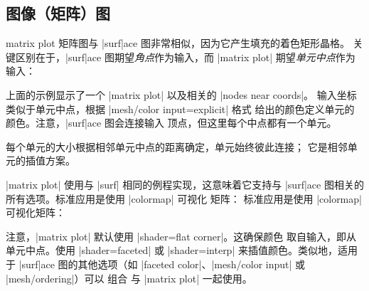 {\subsection{图像（矩阵）图}
\label{sec:imagesc}

\begin{plottype}[/pgfplots]{matrix plot}
    矩阵图与 |surf|ace 图非常相似，因为它产生填充的着色矩形晶格。
    关键区别在于，|surf|ace 图期望\emph{角点}作为输入，而
    |matrix plot| 期望\emph{单元中点}作为输入：
\begin{codeexample}[]
\end{codeexample}
    上面的示例显示了一个 |matrix plot| 以及相关的 |nodes near coords|。
    输入坐标类似于单元中点，根据 |mesh/color input=explicit| 格式
    给出的颜色定义单元的颜色。注意，|surf|ace 图会连接输入
    顶点，但这里每个中点都有一个单元。

    每个单元的大小根据相邻单元中点的距离确定，单元始终彼此连接；
    它是相邻单元的插值方案。

    |matrix plot| 使用与 |surf| 相同的例程实现，这意味着它支持与
    |surf|ace 图相关的所有选项。标准应用是使用 |colormap| 可视化
    矩阵：
    标准应用是使用 |colormap| 可视化矩阵：
\begin{codeexample}[]
\end{codeexample}
    注意，|matrix plot| 默认使用 |shader=flat corner|。这确保颜色
    取自输入，即从单元中点。使用 |shader=faceted| 或 |shader=interp|
    来插值颜色。类似地，适用于 |surf|ace 图的其他选项（如
    |faceted color|、|mesh/color input| 或 |mesh/ordering|）可以
    组合
    与 |matrix plot| 一起使用。


\end{plottype}}
